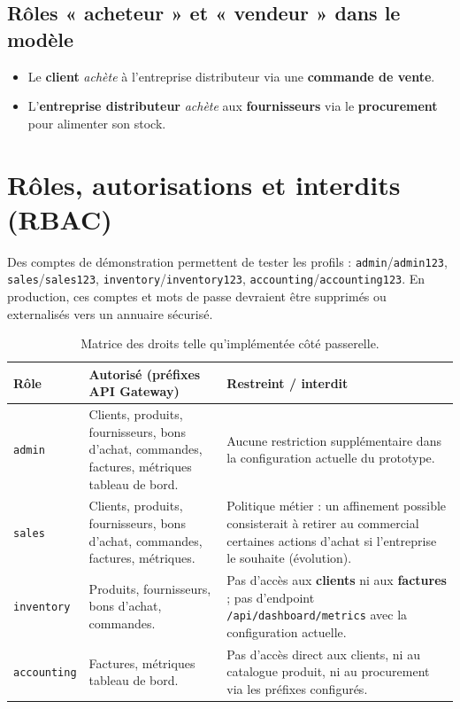 \documentclass[11pt,a4paper]{article}
\begin{document}
\subsection{Rôles « acheteur » et « vendeur » dans le modèle}
\begin{itemize}[noitemsep]
  \item Le \textbf{client} \emph{achète} à l'entreprise distributeur via une \textbf{commande de vente}.
  \item L'\textbf{entreprise distributeur} \emph{achète} aux \textbf{fournisseurs} via le \textbf{procurement} pour alimenter son stock.
\end{itemize}

\section{Rôles, autorisations et interdits (RBAC)}
\label{sec:roles}

Des comptes de démonstration permettent de tester les profils : \texttt{admin}/\texttt{admin123}, \texttt{sales}/\texttt{sales123}, \texttt{inventory}/\texttt{inventory123}, \texttt{accounting}/\texttt{accounting123}. En production, ces comptes et mots de passe devraient être supprimés ou externalisés vers un annuaire sécurisé.

\begin{table}[htbp]
\centering
\small
\begin{tabular}{@{}p{2.1cm}p{5.7cm}p{5.7cm}@{}}
\toprule
\textbf{Rôle} & \textbf{Autorisé (préfixes API Gateway)} & \textbf{Restreint / interdit} \\
\midrule
\texttt{admin} & Clients, produits, fournisseurs, bons d'achat, commandes, factures, métriques tableau de bord. & Aucune restriction supplémentaire dans la configuration actuelle du prototype. \\
\midrule
\texttt{sales} & Clients, produits, fournisseurs, bons d'achat, commandes, factures, métriques. & Politique métier : un affinement possible consisterait à retirer au commercial certaines actions d'achat si l'entreprise le souhaite (évolution). \\
\midrule
\texttt{inventory} & Produits, fournisseurs, bons d'achat, commandes. & Pas d'accès aux \textbf{clients} ni aux \textbf{factures} ; pas d'endpoint \texttt{/api/dashboard/metrics} avec la configuration actuelle. \\
\midrule
\texttt{accounting} & Factures, métriques tableau de bord. & Pas d'accès direct aux clients, ni au catalogue produit, ni au procurement via les préfixes configurés. \\
\bottomrule
\end{tabular}
\caption{Matrice des droits telle qu'implémentée côté passerelle.}
\end{table}
\end{document}
